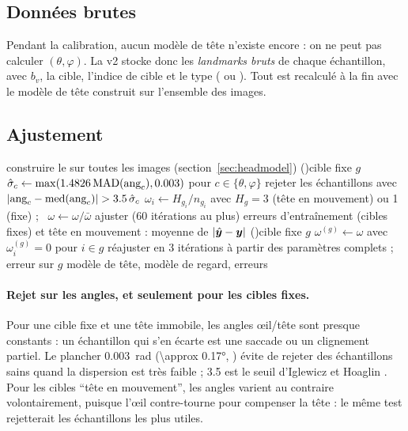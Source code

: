 \subsection{Données brutes}

Pendant la calibration, aucun modèle de tête n'existe encore : on ne peut pas calculer $(\theta, \varphi)$. La v2 stocke donc les \emph{landmarks bruts} de chaque échantillon, avec $b_v$, la cible, l'indice de cible et le type ( ou ). Tout est recalculé à la fin avec le modèle de tête construit sur l'ensemble des images.

\subsection{Ajustement}

\begin{algorithm}[H]
\caption{}
construire le  sur toutes les images (section~\ref{sec:headmodel})\;
\ForEach(){cible fixe $g$}{
  $\hat\sigma_c \leftarrow \max(\num{1.4826}\operatorname{MAD}(\text{ang}_c), \num{0.003})$ pour $c \in \{\theta, \varphi\}$\;
  rejeter les échantillons avec $|\text{ang}_c - \operatorname{med}(\text{ang}_c)| > 3.5\,\hat\sigma_c$\;
}
$\omega_i \leftarrow H_{g_i}/n_{g_i}$ avec $H_g = 3$ (tête en mouvement) ou 1 (fixe) ; \ $\omega \leftarrow \omega/\bar\omega$\;
ajuster  (60 itérations au plus)\;
erreurs d'entraînement (cibles fixes) et tête en mouvement : moyenne de $|\hat{\bm{y}} - \bm{y}|$\;
\ForEach(){cible fixe $g$}{
  $\omega^{(g)} \leftarrow \omega$ avec $\omega^{(g)}_i = 0$ pour $i \in g$\;
  réajuster en 3 itérations à partir des paramètres complets ; erreur sur $g$\;
}
\Return modèle de tête, modèle de regard, erreurs\;
\end{algorithm}

\paragraph{Rejet sur les angles, et seulement pour les cibles fixes.} Pour une cible fixe et une tête immobile, les angles œil/tête sont presque constants : un échantillon qui s'en écarte est une saccade ou un clignement partiel. Le plancher \qty{0.003}{\radian} (\ang{\approx 0.17}, \empi) évite de rejeter des échantillons sains quand la dispersion est très faible ; \num{3.5} est le seuil d'Iglewicz et Hoaglin \cite{iglewicz1993}. Pour les cibles \enquote{tête en mouvement}, les angles varient au contraire volontairement, puisque l'œil contre-tourne pour compenser la tête : le même test rejetterait les échantillons les plus utiles.

